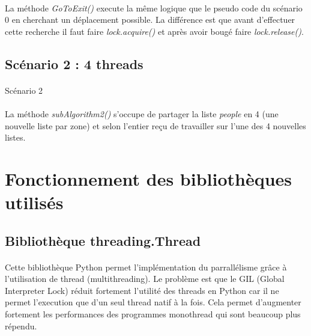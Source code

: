 \documentclass[12pt,oneside,a4paper]{article}
\makeatletter
\def\BState{\State\hskip-\ALG@thistlm}
\makeatother
\begin{document}
\paragraph{}
La méthode \textit{GoToExit()} execute la même logique que le pseudo code du scénario 0 en
cherchant un déplacement possible. La différence est que avant d'effectuer cette recherche il faut faire
\textit{lock.acquire()} et après avoir bougé faire \textit{lock.release()}.

\subsection{Scénario 2 : 4 threads}
\paragraph{}

\begin{algorithm}
  \caption{Scénario 2}\label{euclid}
\end{algorithm}

\paragraph{}
La méthode \textit{subAlgorithm2()} s'occupe de partager la liste \textit{people} en 4 (une nouvelle liste
par zone) et selon l'entier reçu de travailler sur l'une des 4 nouvelles listes.

\section{Fonctionnement des bibliothèques utilisés}

\subsection{Bibliothèque threading.Thread}
\paragraph{}
Cette bibliothèque Python permet l'implémentation du parrallélisme grâce à l'utilisation de thread (multithreading).
Le problème est que le GIL (Global Interpreter Lock) réduit fortement l'utilité des threads en Python
car il ne permet l'execution que d'un seul thread natif à la fois. Cela permet d'augmenter fortement les
performances des programmes monothread qui sont beaucoup plus répendu.
\end{document}
